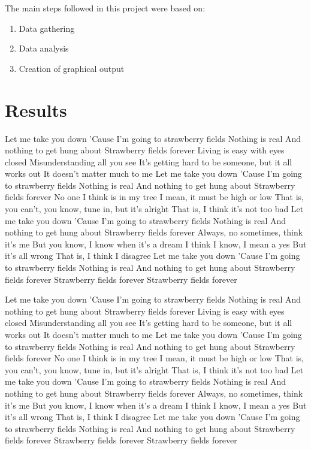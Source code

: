 \documentclass[12pt]{article}
\begin{document}
The main steps followed in this project were based on:
\begin{enumerate}
    \item Data gathering
    \item Data analysis
    \item Creation of graphical output
\end{enumerate}

\section{Results}
Let me take you down
'Cause I'm going to strawberry fields
Nothing is real
And nothing to get hung about
Strawberry fields forever
Living is easy with eyes closed
Misunderstanding all you see
It's getting hard to be someone, but it all works out
It doesn't matter much to me
Let me take you down
'Cause I'm going to strawberry fields
Nothing is real
And nothing to get hung about
Strawberry fields forever
No one I think is in my tree
I mean, it must be high or low
That is, you can't, you know, tune in, but it's alright
That is, I think it's not too bad
Let me take you down
'Cause I'm going to strawberry fields
Nothing is real
And nothing to get hung about
Strawberry fields forever
Always, no sometimes, think it's me
But you know, I know when it's a dream
I think I know, I mean a yes
But it's all wrong
That is, I think I disagree
Let me take you down
'Cause I'm going to strawberry fields
Nothing is real
And nothing to get hung about
Strawberry fields forever
Strawberry fields forever
Strawberry fields forever

Let me take you down
'Cause I'm going to strawberry fields
Nothing is real
And nothing to get hung about
Strawberry fields forever
Living is easy with eyes closed
Misunderstanding all you see
It's getting hard to be someone, but it all works out
It doesn't matter much to me
Let me take you down
'Cause I'm going to strawberry fields
Nothing is real
And nothing to get hung about
Strawberry fields forever
No one I think is in my tree
I mean, it must be high or low
That is, you can't, you know, tune in, but it's alright
That is, I think it's not too bad
Let me take you down
'Cause I'm going to strawberry fields
Nothing is real
And nothing to get hung about
Strawberry fields forever
Always, no sometimes, think it's me
But you know, I know when it's a dream
I think I know, I mean a yes
But it's all wrong
That is, I think I disagree
Let me take you down
'Cause I'm going to strawberry fields
Nothing is real
And nothing to get hung about
Strawberry fields forever
Strawberry fields forever
Strawberry fields forever
\end{document}
